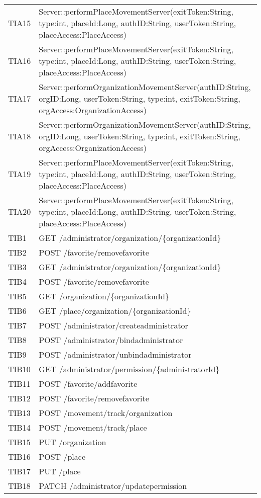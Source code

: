 {\begin{longtable}{C{2cm} C{12cm}}
	TIA15 & Server::performPlaceMovementServer(exitToken:String, type:int, placeId:Long, authID:String, userToken:String, placeAccess:PlaceAccess)\\
	TIA16 & Server::performPlaceMovementServer(exitToken:String, type:int, placeId:Long, authID:String, userToken:String, placeAccess:PlaceAccess)\\
	TIA17 & Server::performOrganizationMovementServer(authID:String, orgID:Long, userToken:String, type:int, exitToken:String, orgAccess:OrganizationAccess)\\
	TIA18 & Server::performOrganizationMovementServer(authID:String, orgID:Long, userToken:String, type:int, exitToken:String, orgAccess:OrganizationAccess)\\
	TIA19 & Server::performPlaceMovementServer(exitToken:String, type:int, placeId:Long, authID:String, userToken:String, placeAccess:PlaceAccess)\\
	TIA20 & Server::performPlaceMovementServer(exitToken:String, type:int, placeId:Long, authID:String, userToken:String, placeAccess:PlaceAccess) \\
	TIB1 & GET /administrator/organization/\{organizationId\} \\
	TIB2 & POST /favorite/removefavorite \\
	TIB3 & GET /administrator/organization/\{organizationId\} \\
	TIB4 & POST /favorite/removefavorite \\
	TIB5 & GET /organization/\{organizationId\} \\
	TIB6 & GET /place/organization/\{organizationId\} \\
	TIB7 & POST /administrator/createadministrator \\
	TIB8 & POST /administrator/bindadministrator \\
	TIB9 & POST /administrator/unbindadministrator \\
	TIB10 & GET /administrator/permission/\{administratorId\} \\
	TIB11 & POST /favorite/addfavorite \\
	TIB12 & POST /favorite/removefavorite \\
	TIB13 & POST /movement/track/organization \\
	TIB14 & POST /movement/track/place \\
	TIB15 & PUT /organization \\
	TIB16 & POST /place \\
	TIB17 & PUT /place \\
	TIB18 & PATCH /administrator/updatepermission \\

\end{longtable}}
